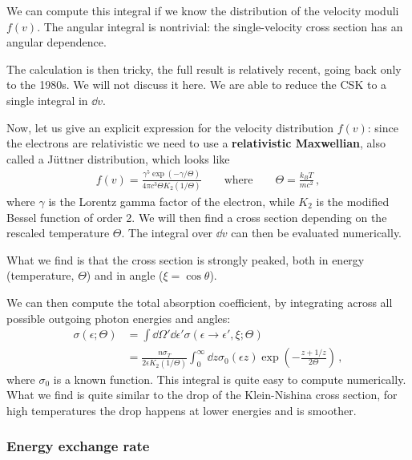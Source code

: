 \documentclass[main.tex]{subfiles}
\begin{document}

We can compute this integral if we know the distribution of the velocity moduli \(f(v)\). The angular integral is nontrivial: the single-velocity cross section has an angular dependence. 

The calculation is then tricky, the full result is relatively recent, going back only to the 1980s. We will not discuss it here.
We are able to reduce the CSK to a single integral in \(\dd{v}\). 

Now, let us give an explicit expression for the velocity distribution \(f(v)\): since the electrons are relativistic we need to use a \textbf{relativistic Maxwellian}, also called a Jüttner distribution, which looks like
%
\begin{align}
f(v) = \frac{\gamma^{5} \exp(- \gamma / \Theta )}{4 \pi c^3 \Theta K_2 (1/\Theta )}
\qquad \text{where} \qquad
\Theta = \frac{k_B T}{mc^2}
\,,
\end{align}
%
where \(\gamma \) is the Lorentz gamma factor of the electron, while \(K_2 \) is the modified Bessel function of order 2.
We will then find a cross section depending on the rescaled temperature \(\Theta \). 
The integral over \(\dd{v}\) can then be evaluated numerically. 

What we find is that the cross section is strongly peaked, both in energy (temperature, \(\Theta \)) and in angle (\(\xi = \cos \theta \)).

We can then compute the total absorption coefficient, by integrating across all possible outgoing photon energies and angles:
%
\begin{align}
\sigma (\epsilon ; \Theta ) &= \int \dd{\Omega }' \dd{\epsilon }' \sigma (\epsilon \to \epsilon ', \xi ; \Theta ) \\
&= \frac{n \sigma_T}{2 \epsilon K_2 (1 / \Theta )}
\int_0^{\infty } \dd{z} \sigma_0 (\epsilon z) \exp(- \frac{z + 1/z}{2 \Theta })
\,,
\end{align}
%
where \(\sigma_0 \) is a known function. This integral is quite easy to compute numerically. 
What we find is quite similar to the drop of the Klein-Nishina cross section, for high temperatures the drop happens at lower energies and is smoother. 

\subsubsection{Energy exchange rate}
\end{document}
